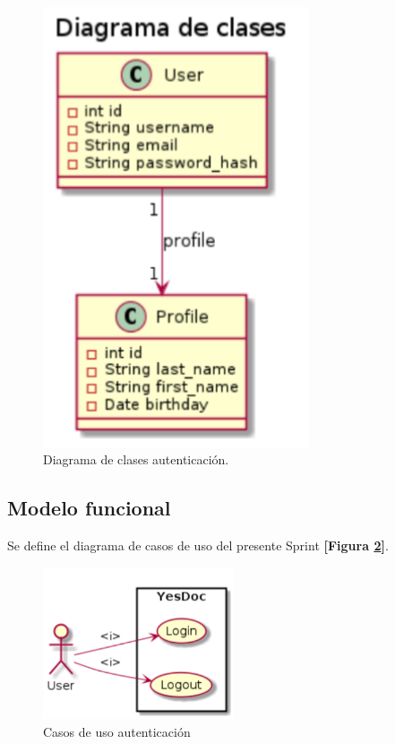 \documentclass[a4paper,12pt]{article}
\begin{document}
\begin{figure}[h]
        \centering
        \includegraphics[width=0.7\textwidth]{img/clases_auth}
        \caption{Diagrama de clases autenticación.}
		\label{5-clase_autenticacion}
    \end{figure}

\subsection{Modelo funcional} 
Se define el diagrama de casos de uso del presente Sprint \textbf{[Figura \ref{4-cu_autenticacion}]}.

    \begin{figure}[h]
        \centering
        \includegraphics[width=0.5\textwidth]{img/cu_autenticacion}
        \caption{Casos de uso autenticación}
		\label{4-cu_autenticacion}
    \end{figure}
\end{document}
